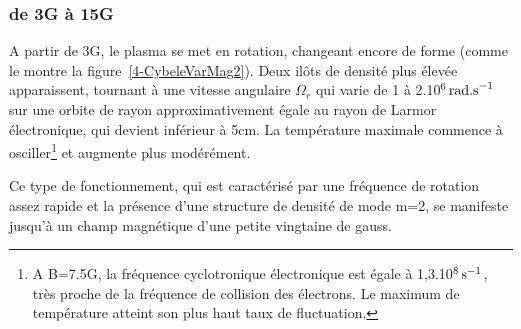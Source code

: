 \begin{refsection}
\subsubsection{de 3G à 15G}
A partir de 3G, le plasma se met en rotation, changeant encore de forme (comme
le montre la figure~\ref{4-CybeleVarMag2}). Deux ilôts de densité plus élevée
apparaissent, tournant à une vitesse angulaire $\Omega_r$ qui varie de 1 à 
2.10$^{{6}}\,\text{rad.s}^{{-1}}$ sur une orbite de rayon
 approximativement égale au rayon de Larmor électronique, qui devient inférieur
à 5cm. La température maximale commence à osciller\footnote{A B=7.5G, la
fréquence cyclotronique électronique est égale à
1,3.10$^{{8}}\,\text{s}^{{-1}}$, très proche de la fréquence de
collision des électrons. Le maximum de température atteint son plus haut taux de fluctuation.} et augmente plus modérément.

Ce type de fonctionnement, qui est caractérisé par une
fréquence de rotation assez rapide et la présence d'une structure de densité de
mode m=2, se manifeste jusqu'à un champ magnétique d'une petite vingtaine de
gauss. 


\end{refsection}
